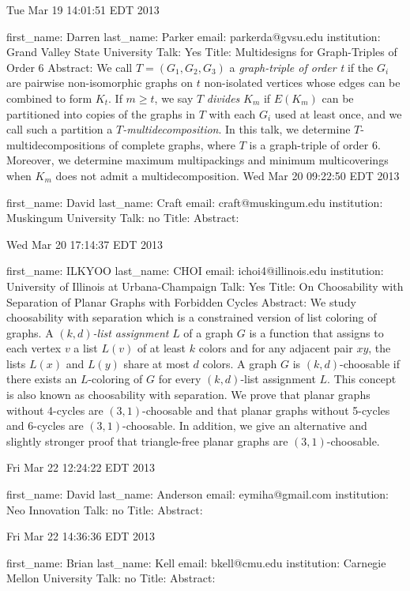 \documentclass{article}
\begin{document}
Tue Mar 19 14:01:51 EDT 2013

first_name: Darren
last_name: Parker
email: parkerda@gvsu.edu
institution: Grand Valley State University
Talk: Yes
Title: Multidesigns for Graph-Triples of Order 6
Abstract: We call $T=(G_1,G_2,G_3)$ a \emph{graph-triple of order t} if the $G_i$ are pairwise non-isomorphic graphs on $t$ non-isolated vertices whose edges can be combined to form $K_t$.  If $m \geq t$, we say $T$ \emph{divides} $K_m$ if $E(K_m)$ can be partitioned into copies of the graphs in $T$ with each $G_i$ used at least once, and we call such a partition a \emph{$T$-multidecomposition}.  In this talk, we determine $T$-multidecompositions of complete graphs, where $T$ is a graph-triple of order 6. Moreover, we determine maximum multipackings and minimum multicoverings when $K_m$ does not admit a multidecomposition.
Wed Mar 20 09:22:50 EDT 2013

first_name: David
last_name: Craft
email: craft@muskingum.edu
institution: Muskingum University
Talk: no
Title:
Abstract:

Wed Mar 20 17:14:37 EDT 2013

first_name: ILKYOO
last_name: CHOI
email: ichoi4@illinois.edu
institution: University of Illinois at Urbana-Champaign
Talk: Yes
Title: On Choosability with Separation of Planar Graphs with Forbidden Cycles
Abstract: We study choosability with separation which is a constrained version of list coloring of graphs. A \emph{$(k,d)$-list assignment} $L$ of a graph $G$ is a function that assigns to each vertex $v$ a list $L(v)$ of at least $k$ colors and for any adjacent pair $xy$, the lists $L(x)$ and $L(y)$ share at most $d$ colors. A graph $G$ is $(k,d)$-choosable if there exists an $L$-coloring of $G$ for every $(k,d)$-list assignment $L$. This concept is also known as choosability with separation. We prove that planar graphs without 4-cycles are $(3,1)$-choosable and that planar graphs without 5-cycles and 6-cycles are $(3,1)$-choosable. In addition, we give an alternative and slightly stronger proof that triangle-free planar graphs are $(3,1)$-choosable.


Fri Mar 22 12:24:22 EDT 2013

first_name: David
last_name: Anderson
email: eymiha@gmail.com
institution: Neo Innovation
Talk: no
Title:
Abstract:


Fri Mar 22 14:36:36 EDT 2013

first_name: Brian
last_name: Kell
email: bkell@cmu.edu
institution: Carnegie Mellon University
Talk: no
Title:
Abstract:
\end{document}

